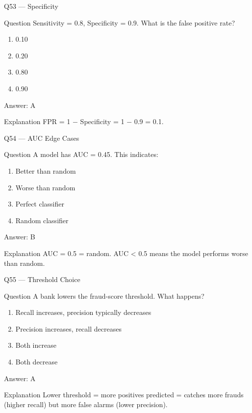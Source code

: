 \documentclass[aspectratio=169,8pt]{beamer}
\begin{document}
	\begin{frame}{Q53 --- Specificity}
		\begin{block}{Question}
			Sensitivity = 0.8, Specificity = 0.9. What is the false positive rate?
		\end{block}
		\begin{enumerate}
			\item 0.10
			\item 0.20
			\item 0.80
			\item 0.90
		\end{enumerate}
		\begin{exampleblock}{Answer: A}\end{exampleblock}
		\begin{block}{Explanation}
			FPR = 1 $-$ Specificity = 1 $-$ 0.9 = 0.1.
		\end{block}
	\end{frame}
	
	\begin{frame}{Q54 --- AUC Edge Cases}
		\begin{block}{Question}
			A model has AUC = 0.45. This indicates:
		\end{block}
		\begin{enumerate}
			\item Better than random
			\item Worse than random
			\item Perfect classifier
			\item Random classifier
		\end{enumerate}
		\begin{exampleblock}{Answer: B}\end{exampleblock}
		\begin{block}{Explanation}
			AUC = 0.5 = random. AUC < 0.5 means the model performs worse than random.
		\end{block}
	\end{frame}
	
	\begin{frame}{Q55 --- Threshold Choice}
		\begin{block}{Question}
			A bank lowers the fraud-score threshold. What happens?
		\end{block}
		\begin{enumerate}
			\item Recall increases, precision typically decreases
			\item Precision increases, recall decreases
			\item Both increase
			\item Both decrease
		\end{enumerate}
		\begin{exampleblock}{Answer: A}\end{exampleblock}
		\begin{block}{Explanation}
			Lower threshold = more positives predicted = catches more frauds (higher recall) but more false alarms (lower precision).
		\end{block}
	\end{frame}
	
\end{document}
